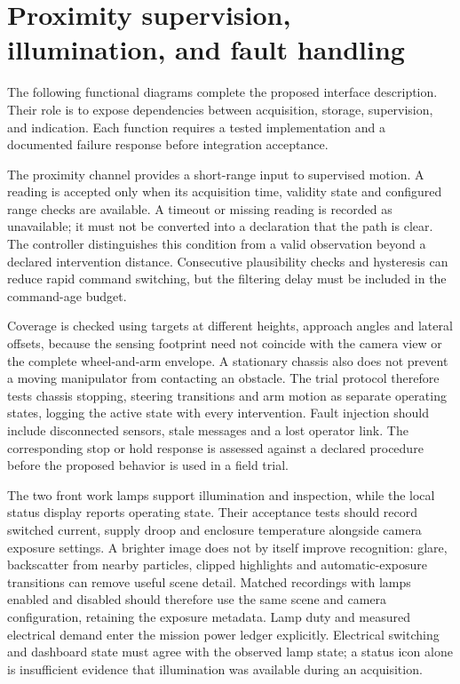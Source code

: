 \documentclass[11pt,letterpaper]{article}
\begin{document}
\FloatBarrier
\section{Proximity supervision, illumination, and fault handling}

The following functional diagrams complete the proposed interface description. Their role is to expose dependencies between acquisition, storage, supervision, and indication. Each function requires a tested implementation and a documented failure response before integration acceptance.

The proximity channel provides a short-range input to supervised motion. A reading is accepted only when its acquisition time, validity state and configured range checks are available. A timeout or missing reading is recorded as unavailable; it must not be converted into a declaration that the path is clear. The controller distinguishes this condition from a valid observation beyond a declared intervention distance. Consecutive plausibility checks and hysteresis can reduce rapid command switching, but the filtering delay must be included in the command-age budget.

Coverage is checked using targets at different heights, approach angles and lateral offsets, because the sensing footprint need not coincide with the camera view or the complete wheel-and-arm envelope. A stationary chassis also does not prevent a moving manipulator from contacting an obstacle. The trial protocol therefore tests chassis stopping, steering transitions and arm motion as separate operating states, logging the active state with every intervention. Fault injection should include disconnected sensors, stale messages and a lost operator link. The corresponding stop or hold response is assessed against a declared procedure before the proposed behavior is used in a field trial.

The two front work lamps support illumination and inspection, while the local status display reports operating state. Their acceptance tests should record switched current, supply droop and enclosure temperature alongside camera exposure settings. A brighter image does not by itself improve recognition: glare, backscatter from nearby particles, clipped highlights and automatic-exposure transitions can remove useful scene detail. Matched recordings with lamps enabled and disabled should therefore use the same scene and camera configuration, retaining the exposure metadata. Lamp duty and measured electrical demand enter the mission power ledger explicitly. Electrical switching and dashboard state must agree with the observed lamp state; a status icon alone is insufficient evidence that illumination was available during an acquisition.
\end{document}
